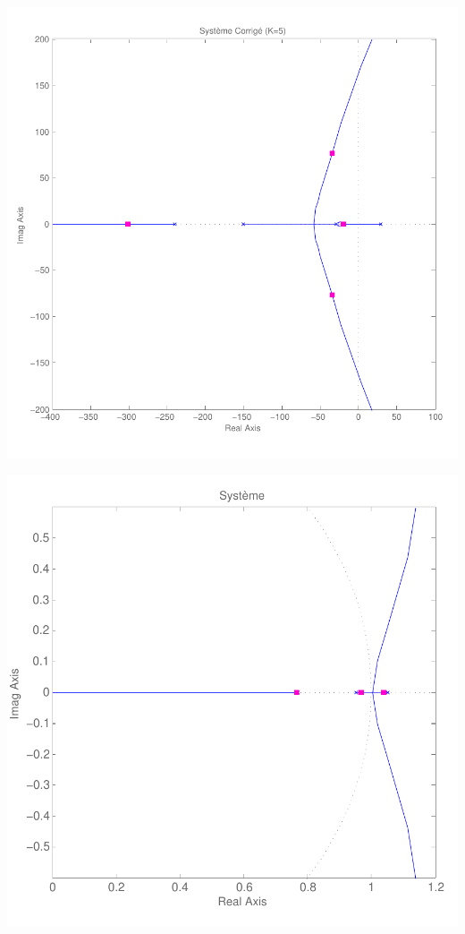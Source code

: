 \documentclass[11pt, french]{article} %
\begin{document}
\includegraphics[scale=0.50]{RL_Sys_AvPh_K5.pdf}

\includegraphics[scale=0.50]{RLN_Sys_Seul.pdf}
\end{document}
